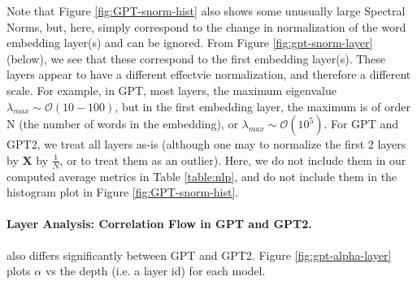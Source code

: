Note that Figure \ref{fig:GPT-snorm-hist} also shows some unusually large Spectral Norms, but,
here, simply correspond to the change in normalization of the word embedding layer(s) and can be ignored.
From Figure \ref{fig:gpt-snorm-layer} (below), we see that these correspond to the first embedding layer(s).
These layers appear to have a different effectvie normalization, and therefore a different scale.
For example, in GPT, most layers, the maximum eigenvalue $\lambda_{max}\sim\mathcal{O}(10-100)$,
but in the first embedding layer, the maximum is of order N (the number of words in the embedding), or
 $\lambda_{max}\sim\mathcal{O}(10^{5})$.  For GPT and GPT2, we treat all layers as-is (although one may to normalize
the first 2 layers by  $\mathbf{X}$ by $\frac{1}{N}$, or to treat them as an outlier).
Here, we do not include them in our computed average metrics in Table \ref{table:nlp},
and do not include them in the histogram plot in Figure \ref{fig:GPT-snorm-hist}.

\paragraph{Layer Analysis: Correlation Flow in GPT and GPT2.} 

also differs significantly between GPT and GPT2.
Figure \ref{fig:gpt-alpha-layer} plots $\alpha$ vs the depth (i.e. a layer id) for each model.


